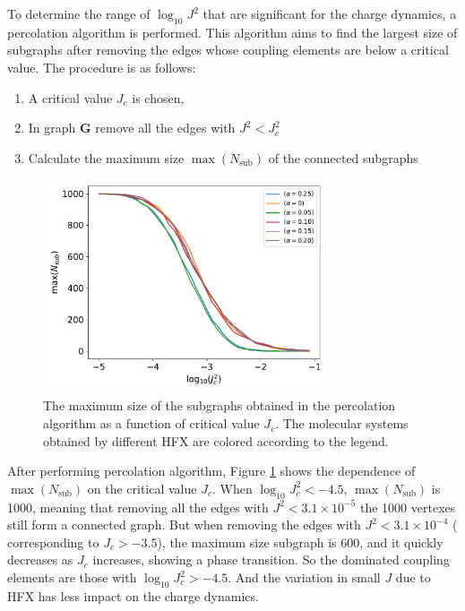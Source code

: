 \documentclass[letterpaper,12pt]{article}
\begin{document}
To determine the range of $\log_{10} J^2$ that are significant for the charge dynamics, a percolation algorithm is performed. This algorithm aims to find the largest size of subgraphs after removing the edges whose coupling elements are below a critical value. The procedure is as follows:
\begin{enumerate}
    \item A critical value $J_c$ is chosen,
    \item In graph $\mathbf{G}$ remove all the edges with $J^2 < J_c^2$
    \item Calculate the maximum size $\max({N_\text{sub}})$ of the connected subgraphs
\end{enumerate}

\begin{figure}[H]
    \centering
    \includegraphics[width=0.75\textwidth]{figs/MADN_HFX/fig_network_all.pdf}
    \caption{The maximum size of the subgraphs obtained in the percolation algorithm as a function of critical value $J_c$. The molecular systems obtained by different HFX are colored according to the legend.}
    \label{fig:J_percolate}
\end{figure}
After performing percolation algorithm, Figure \ref{fig:J_percolate} shows the dependence of $\max({N_\text{sub}})$ on the critical value $J_c$. When $\log_{10} J_c^2 < -4.5$, $\max({N_\text{sub}})$ is 1000, meaning that removing all the edges with $J^2 < 3.1 \times 10^{-5}$ the 1000 vertexes still form a connected graph. 
But when removing the edges with $J^2 < 3.1 \times 10^{-4}$ ( corresponding to $J_c > -3.5$), the maximum size subgraph is 600, and it quickly decreases as $J_c$ increases, showing a phase transition. 
So the dominated coupling elements are those with $\log_{10} J_c^2 > -4.5$. 
And the variation in small $J$ due to HFX has less impact on the charge dynamics. 
\end{document}
